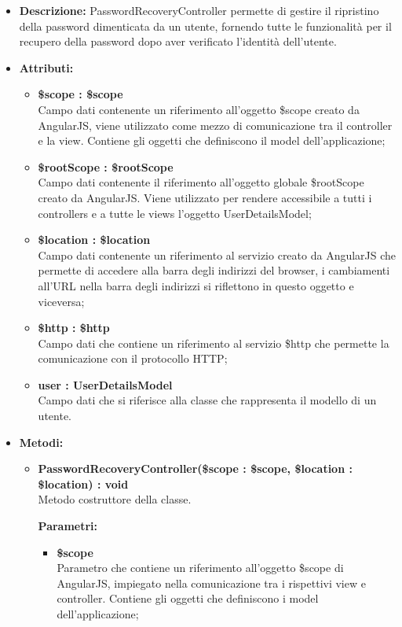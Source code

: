 \begin{itemize}
	\item \textbf{Descrizione:} PasswordRecoveryController permette di gestire il ripristino della password
dimenticata da un utente, fornendo tutte le funzionalità per il recupero della password dopo aver verificato l'identità dell'utente.
	\item \textbf{Attributi:}
		\begin{itemize}
		
			\item \textbf{\$scope : \$scope}\\
			Campo dati contenente un riferimento all'oggetto \$scope creato da AngularJS, viene utilizzato come mezzo di comunicazione tra il controller e la view. Contiene gli oggetti che definiscono il model dell'applicazione;
			
			\item \textbf{\$rootScope : \$rootScope}\\
			Campo dati contenente il riferimento all'oggetto globale \$rootScope creato da AngularJS. Viene utilizzato per rendere accessibile a tutti i controllers e a tutte le views l'oggetto UserDetailsModel;
			
			\item \textbf{\$location : \$location}\\
			Campo dati contenente un riferimento al servizio creato da AngularJS che permette di accedere alla barra degli indirizzi del browser, i cambiamenti all'URL nella barra degli indirizzi si riflettono in questo oggetto e viceversa;

			\item \textbf{\$http : \$http }\\
			Campo dati che contiene un riferimento al servizio \$http che permette la comunicazione con il protocollo HTTP;
				
			\item \textbf{user : UserDetailsModel }\\
			Campo dati che si riferisce alla classe che rappresenta il modello di un utente.

		\end{itemize}
	\item \textbf{Metodi:}
		\begin{itemize}
		
			\item \textbf{PasswordRecoveryController(\$scope : \$scope, \$location : \$location) : void}\\
			Metodo costruttore della classe.
			\begin{description}
    			\item[\textbf{Parametri:}]
			\end{description}
			\begin{itemize}
				\item \textbf{\$scope}\\
				Parametro che contiene un riferimento all'oggetto \$scope di AngularJS, impiegato nella comunicazione tra i rispettivi view e controller. Contiene gli oggetti che definiscono i model dell'applicazione;
				

\end{itemize}
\end{itemize}
\end{itemize}
